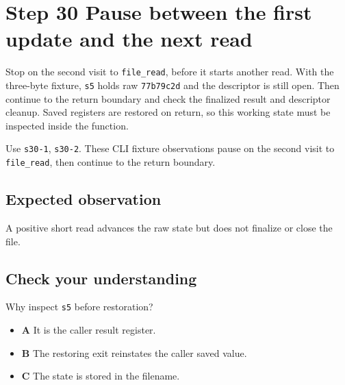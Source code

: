 \section{Step 30 Pause between the first update and the next read}\label{crc-s30}

Stop on the second visit to \texttt{file\_read}, before it starts another read. With the three-byte fixture, \texttt{s5} holds raw \texttt{77b79c2d} and the descriptor is still open. Then continue to the return boundary and check the finalized result and descriptor cleanup. Saved registers are restored on return, so this working state must be inspected inside the function.

Use \texttt{s30-1}, \texttt{s30-2}. These CLI fixture observations pause on the second visit to \texttt{file\_read}, then continue to the return boundary.

\subsection{Expected observation}
A positive short read advances the raw state but does not finalize or close the file.

\subsection{Check your understanding}
Why inspect \texttt{s5} before restoration?

\begin{itemize}
  \item \textbf{A} It is the caller result register.
  \item \textbf{B} The restoring exit reinstates the caller saved value.
  \item \textbf{C} The state is stored in the filename.
\end{itemize}
